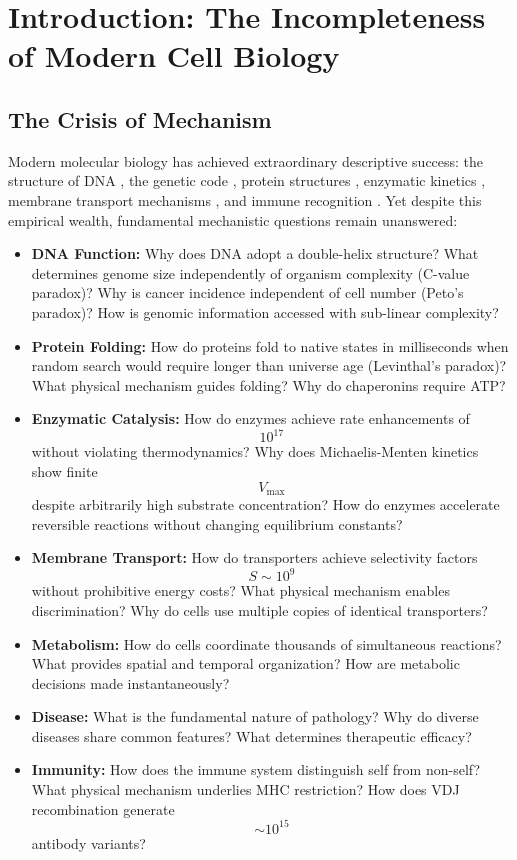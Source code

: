 \documentclass[12pt,a4paper]{article}
\begin{document}
\tableofcontents
\newpage

\section{Introduction: The Incompleteness of Modern Cell Biology}

\subsection{The Crisis of Mechanism}

Modern molecular biology has achieved extraordinary descriptive success: the structure of DNA \cite{watson1953}, the genetic code \cite{crick1961}, protein structures \cite{kendrew1958}, enzymatic kinetics \cite{michaelis1913}, membrane transport mechanisms \cite{skou1957}, and immune recognition \cite{tonegawa1983}. Yet despite this empirical wealth, fundamental mechanistic questions remain unanswered:

\begin{itemize}
\item \textbf{DNA Function:} Why does DNA adopt a double-helix structure? What determines genome size independently of organism complexity (C-value paradox)? Why is cancer incidence independent of cell number (Peto's paradox)? How is genomic information accessed with sub-linear complexity?

\item \textbf{Protein Folding:} How do proteins fold to native states in milliseconds when random search would require longer than universe age (Levinthal's paradox)? What physical mechanism guides folding? Why do chaperonins require ATP?

\item \textbf{Enzymatic Catalysis:} How do enzymes achieve rate enhancements of $$10^{17}$$ without violating thermodynamics? Why does Michaelis-Menten kinetics show finite $$V_{\max}$$ despite arbitrarily high substrate concentration? How do enzymes accelerate reversible reactions without changing equilibrium constants?

\item \textbf{Membrane Transport:} How do transporters achieve selectivity factors $$S \sim 10^9$$ without prohibitive energy costs? What physical mechanism enables discrimination? Why do cells use multiple copies of identical transporters?

\item \textbf{Metabolism:} How do cells coordinate thousands of simultaneous reactions? What provides spatial and temporal organization? How are metabolic decisions made instantaneously?

\item \textbf{Disease:} What is the fundamental nature of pathology? Why do diverse diseases share common features? What determines therapeutic efficacy?

\item \textbf{Immunity:} How does the immune system distinguish self from non-self? What physical mechanism underlies MHC restriction? How does VDJ recombination generate $$\sim 10^{15}$$ antibody variants?
\end{itemize}
\end{document}
